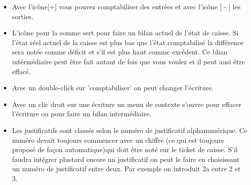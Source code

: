 \begin{itemize}
 	\item Avec l'icône[+] vous pouvez comptabiliser des entrées et avec l'icône  [ - ] les sorties.
	\item L'icône pour la somme sert pour faire un bilan actuel de l'état de caisse. Si l'état réel actuel de la caisse est plus bas que l'état comptabilisé la différence sera notée comme déficit et s'il est plus haut comme excédent. Ce blian intérmédiaire peut être fait autant de fois que vous voulez et il peut ausi être effacé.

	\item Avec un double-click sur 'comptabiliser' on peut changer l'écriture.

	\item Avec un clic droit sur une écriture un menu de contexte s'ouvre pour effacer l'écriture ou pour faire un bilan intermédiaire.

	\item Les justificatifs sont classés selon le numéro de justificatif alphanumérique. Ce numéro devait toujours commencer avec un chiffre (ce qui est toujours proposé de façon automatique)qui doit être noté sur le ticket de caisse. S'il faudra intégrer plustard encore un justificatif on peut le faire en choisissant un numéro de justificatif entre deux. Par exemple on introduit 2a entre 2 et 3. 
\end{itemize}



